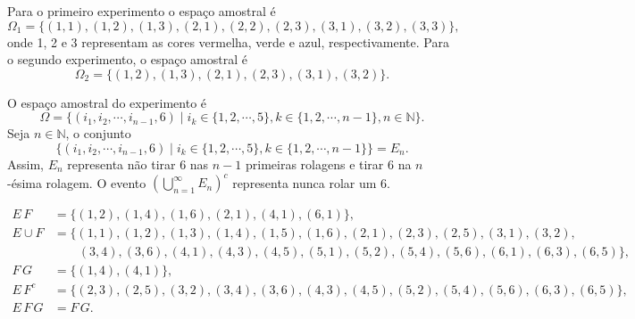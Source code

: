 
\begin{questions}

\begin{solution}
	Para o primeiro experimento o espaço amostral é
    \[\Omega_1 = \{ (1,1),(1,2),(1,3),(2,1),(2,2),(2,3),(3,1),(3,2),(3,3) \},\]
    onde 1, 2 e 3 representam as cores vermelha, verde e azul, respectivamente. Para o segundo experimento, o espaço amostral é
    \[\Omega_2 = \{ (1,2),(1,3),(2,1),(2,3),(3,1),(3,2) \}.\]
\end{solution}

\begin{solution}
	O espaço amostral do experimento é
    \[\Omega = \{ (i_1,i_2,\cdots,i_{n-1},6) \mid i_k\in\{1,2,\cdots,5\}, k\in\{1,2,\cdots,n-1\}, n\in\mathbb{N} \}.\]
    Seja $n\in\mathbb{N}$, o conjunto 
    \[\{ (i_1,i_2,\cdots,i_{n-1},6) \mid i_k\in\{1,2,\cdots,5\}, k\in\{1,2,\cdots,n-1\}\} = E_n.\]
    Assim, $E_n$ representa não tirar 6 nas $n-1$ primeiras rolagens e tirar 6 na $n$-ésima rolagem. O evento $\left( \bigcup_{n=1}^\infty E_n \right)^c$ representa nunca rolar um 6.
\end{solution}

\begin{solution}
\begin{align*}
	E\,F 		&= \{(1,2),(1,4),(1,6),(2,1),(4,1),(6,1)\},\\
    E\cup F 	&= \{(1,1),(1,2),(1,3),(1,4),(1,5),(1,6),
    				(2,1),(2,3),(2,5),(3,1),(3,2),\\
    			&\quad\quad	(3,4),(3,6),(4,1),(4,3),(4,5),
                	(5,1),(5,2),(5,4),(5,6),(6,1),(6,3),(6,5)\},\\
	F\,G		&= \{(1,4),(4,1)\},\\
    E\,F^c		&= \{(2,3),(2,5),(3,2),(3,4),(3,6),(4,3),(4,5),(5,2),
    				(5,4),(5,6),(6,3),(6,5)\},\\
	E\,F\,G		&= F\,G.
\end{align*}
\end{solution}


\end{questions}
